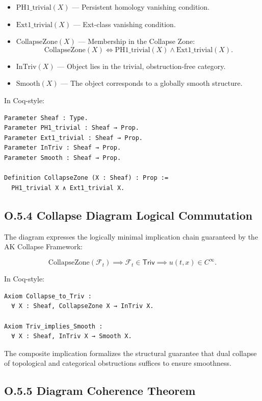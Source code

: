 \documentclass[11pt]{article}
\begin{document}
\begin{itemize}
  \item \( \mathrm{PH1\_trivial}(X) \) — Persistent homology vanishing condition.
  \item \( \mathrm{Ext1\_trivial}(X) \) — Ext-class vanishing condition.
  \item \( \mathrm{CollapseZone}(X) \) — Membership in the Collapse Zone:
  \[
  \mathrm{CollapseZone}(X) \iff \mathrm{PH1\_trivial}(X) \land \mathrm{Ext1\_trivial}(X).
  \]
  \item \( \mathrm{InTriv}(X) \) — Object lies in the trivial, obstruction-free category.
  \item \( \mathrm{Smooth}(X) \) — The object corresponds to a globally smooth structure.
\end{itemize}

In Coq-style:

\begin{lstlisting}[language=Coq]
Parameter Sheaf : Type.
Parameter PH1_trivial : Sheaf → Prop.
Parameter Ext1_trivial : Sheaf → Prop.
Parameter InTriv : Sheaf → Prop.
Parameter Smooth : Sheaf → Prop.

Definition CollapseZone (X : Sheaf) : Prop :=
  PH1_trivial X ∧ Ext1_trivial X.
\end{lstlisting}

\subsection*{O.5.4 Collapse Diagram Logical Commutation}

The diagram expresses the logically minimal implication chain guaranteed by the AK Collapse Framework:

\[
\mathrm{CollapseZone}(\mathcal{F}_t)
\implies \mathcal{F}_t \in \mathsf{Triv}
\implies u(t, x) \in C^\infty.
\]

In Coq-style:

\begin{lstlisting}[language=Coq]
Axiom Collapse_to_Triv :
  ∀ X : Sheaf, CollapseZone X → InTriv X.

Axiom Triv_implies_Smooth :
  ∀ X : Sheaf, InTriv X → Smooth X.
\end{lstlisting}

The composite implication formalizes the structural guarantee that dual collapse of topological and categorical obstructions suffices to ensure smoothness.

\subsection*{O.5.5 Diagram Coherence Theorem}
\end{document}
